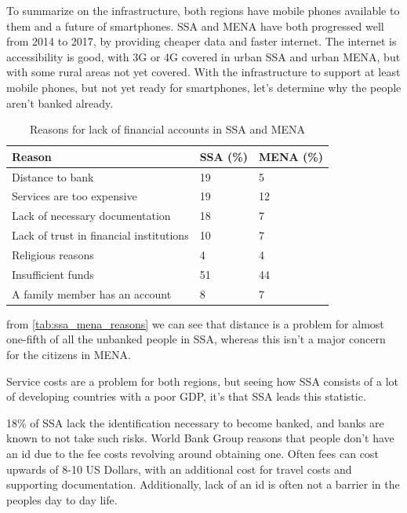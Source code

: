 \documentclass[11pt, a4paper]{article}
\begin{document}
To summarize on the infrastructure, both regions have mobile phones available to them and a future of smartphones. SSA and MENA have both progressed well from 2014 to 2017, by providing cheaper data and faster internet. The internet is accessibility is good, with 3G or 4G covered in urban SSA and urban MENA, but with some rural areas not yet covered. With the infrastructure to support at least mobile phones, but not yet ready for smartphones, let's determine why the people aren't banked already.

\begin{table}[!ht]
\centering
\begin{tabular}{|l|l|l|}
\hline
\textbf{Reason} & \textbf{SSA (\%)} & \textbf{MENA (\%)} \\ \hline
Distance to bank & 19 & 5 \\ \hline
Services are too expensive & 19 & 12 \\ \hline
Lack of necessary documentation & 18 & 7 \\ \hline
Lack of trust in financial institutions & 10 & 7 \\ \hline
Religious reasons & 4 & 4 \\ \hline
Insufficient funds & 51 & 44 \\ \hline
A family member has an account & 8 & 7\\ \hline
\end{tabular}
\caption{Reasons for lack of financial accounts in SSA and MENA\cite{gfindex}}
\label{tab:ssa_mena_reasons}
\end{table}

from \autoref{tab:ssa_mena_reasons} we can see that distance is a problem for almost one-fifth of all the unbanked people in SSA, whereas this isn't a major concern for the citizens in MENA.

Service costs are a problem for both regions, but seeing how SSA consists of a lot of developing countries with a poor GDP, it's that SSA leads this statistic.

18\% of SSA lack the identification necessary to become banked, and banks are known to not take such risks. World Bank Group\cite{worldbankid} reasons that people don't have an id due to the fee costs revolving around obtaining one. Often fees can cost upwards of 8-10 US Dollars\cite{worldbankid}, with an additional cost for travel costs and supporting documentation\cite{worldbankid}. Additionally, lack of an id is often not a barrier in the peoples day to day life\cite{worldbankid}.
\end{document}
